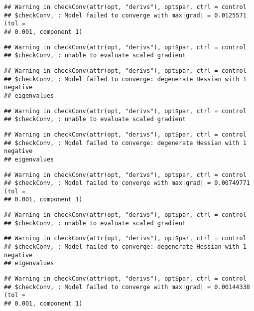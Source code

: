 \documentclass[]{article}
\begin{document}
\begin{verbatim}
## Warning in checkConv(attr(opt, "derivs"), opt$par, ctrl = control
## $checkConv, : Model failed to converge with max|grad| = 0.0125571 (tol =
## 0.001, component 1)
\end{verbatim}

\begin{verbatim}
## Warning in checkConv(attr(opt, "derivs"), opt$par, ctrl = control
## $checkConv, : unable to evaluate scaled gradient
\end{verbatim}

\begin{verbatim}
## Warning in checkConv(attr(opt, "derivs"), opt$par, ctrl = control
## $checkConv, : Model failed to converge: degenerate Hessian with 1 negative
## eigenvalues
\end{verbatim}

\begin{verbatim}
## Warning in checkConv(attr(opt, "derivs"), opt$par, ctrl = control
## $checkConv, : unable to evaluate scaled gradient
\end{verbatim}

\begin{verbatim}
## Warning in checkConv(attr(opt, "derivs"), opt$par, ctrl = control
## $checkConv, : Model failed to converge: degenerate Hessian with 1 negative
## eigenvalues
\end{verbatim}

\begin{verbatim}
## Warning in checkConv(attr(opt, "derivs"), opt$par, ctrl = control
## $checkConv, : Model failed to converge with max|grad| = 0.00749771 (tol =
## 0.001, component 1)
\end{verbatim}

\begin{verbatim}
## Warning in checkConv(attr(opt, "derivs"), opt$par, ctrl = control
## $checkConv, : unable to evaluate scaled gradient
\end{verbatim}

\begin{verbatim}
## Warning in checkConv(attr(opt, "derivs"), opt$par, ctrl = control
## $checkConv, : Model failed to converge: degenerate Hessian with 1 negative
## eigenvalues
\end{verbatim}

\begin{verbatim}
## Warning in checkConv(attr(opt, "derivs"), opt$par, ctrl = control
## $checkConv, : Model failed to converge with max|grad| = 0.00144338 (tol =
## 0.001, component 1)
\end{verbatim}
\end{document}
